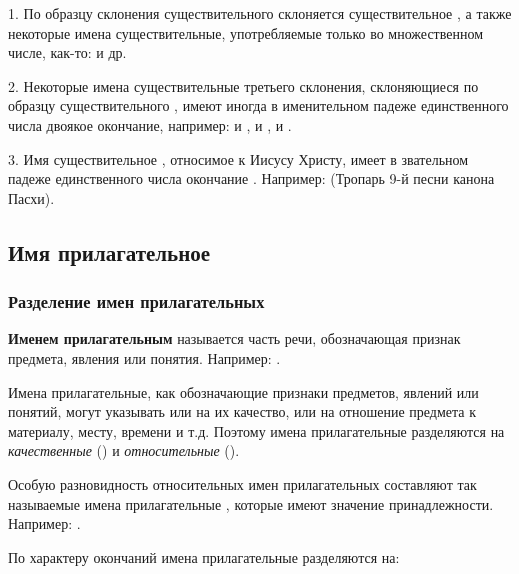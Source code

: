 \documentclass[11pt,a4paper,oneside]{memoir}
\begin{document}
    1. По образцу склонения существительного {} склоняется существительное {}, а также некоторые имена существительные, употребляемые только во множественном числе, как-то: {} и др.
    
    2. Некоторые имена существительные третьего склонения, склоняющиеся по образцу существительного {}, имеют иногда в именительном падеже единственного числа двоякое окончание, например: {} и {}, {} и {}, {} и {}.
    
    3. Имя существительное {}, относимое к Иисусу Христу, имеет в звательном падеже единственного числа окончание {}. Например: {} (Тропарь 9-й песни канона Пасхи).

            \subsection{Имя прилагательное}
                \subsubsection{Разделение имен прилагательных}

    \textbf{Именем прилагательным} называется часть речи, обозначающая признак предмета, явления или понятия. Например: {}.
    
    Имена прилагательные, как обозначающие признаки предметов, явлений или понятий, могут указывать или на их качество, или на отношение предмета к материалу, месту, времени и т.д. Поэтому имена прилагательные разделяются на \emph{качественные} ({}) и \emph{относительные} ({}).
    
    Особую разновидность относительных имен прилагательных составляют так называемые имена прилагательные {}, которые имеют значение принадлежности. Например: {}.
    
    По характеру окончаний имена прилагательные разделяются на:
    
    \medskip{}
\end{document}
